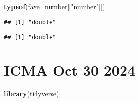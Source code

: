 \documentclass[
]{article}
\newenvironment{Shaded}{\begin{snugshade}}{\end{snugshade}}
\newcommand{\FunctionTok}[1]{\textcolor[rgb]{0.13,0.29,0.53}{\textbf{#1}}}
\newcommand{\NormalTok}[1]{#1}
\newcommand{\SpecialCharTok}[1]{\textcolor[rgb]{0.81,0.36,0.00}{\textbf{#1}}}
\newcommand{\StringTok}[1]{\textcolor[rgb]{0.31,0.60,0.02}{#1}}
\begin{document}
\begin{Shaded}
\begin{Highlighting}[]
\FunctionTok{typeof}\NormalTok{(fave\_number[[}\StringTok{"number"}\NormalTok{]])}
\end{Highlighting}
\end{Shaded}

\begin{verbatim}
## [1] "double"
\end{verbatim}

\begin{Shaded}
\end{Shaded}

\begin{verbatim}
## [1] "double"
\end{verbatim}

\section{ICMA Oct 30 2024}\label{icma-oct-30-2024}

\begin{Shaded}
\begin{Highlighting}[]
\FunctionTok{library}\NormalTok{(tidyverse)}
\end{Highlighting}
\end{Shaded}
\end{document}
